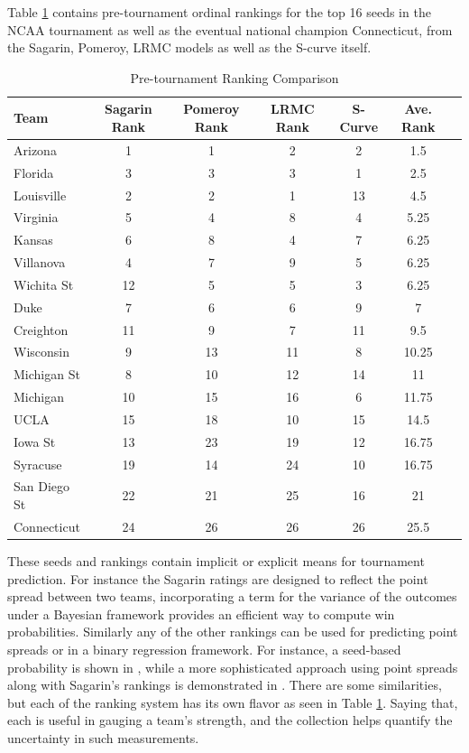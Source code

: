 \documentclass[letterpaper,12pt]{article}
\begin{document}
Table \ref{tab:ranks} contains pre-tournament ordinal rankings for the top 16 seeds in the NCAA tournament as well as the eventual national champion Connecticut, from the Sagarin, Pomeroy, LRMC models as well as the S-curve itself.
\begin{table}[h!]
\caption{Pre-tournament Ranking Comparison}
\footnotesize
\centering
\begin{tabular}{l|ccccc|c}
  \hline
  \hline
 Team & Sagarin Rank &  Pomeroy Rank  & LRMC Rank & S-Curve& Ave. Rank  \\ 
  \hline
 Arizona         & 1  &1      & 2 & 2& 1.5  \\
 Florida          & 3  &3      &3 & 1& 2.5\\
 Louisville      & 2  &2      & 1 &13 & 4.5\\
 Virginia         & 5  &4       &8 & 4 &5.25\\
  Kansas         & 6  &8      & 4& 7 &6.25\\
 Villanova      & 4  &7       & 9 & 5 &6.25\\
 Wichita St    & 12 &5          &5 & 3 &6.25\\
 Duke             & 7  &6         &6 &9&7\\
  Creighton &  11 &   9   &7 &11& 9.5\\ 
 Wisconsin  &   9   &13     &  11 & 8 &10.25\\
 Michigan St & 8  &10   & 12& 14&11\\
 Michigan & 10 & 15&  16& 6 &11.75\\
 UCLA & 15& 18& 10 &15 &14.5\\
 Iowa St &13 &23  &19 &12 &16.75 \\
 Syracuse &19 &14   &24 &10 &16.75 \\
 San Diego St&22 &21   &25 &16 &21 \\
  \hline
  Connecticut & 24& 26& 26& 26&25.5\\
  \hline
   \hline
\end{tabular}
\label{tab:ranks}
\end{table}
These seeds and rankings contain implicit or explicit means for tournament prediction. For instance the Sagarin ratings are designed to reflect the point spread between two teams, incorporating a term for the variance of the outcomes under a Bayesian framework provides an efficient way to compute win probabilities. Similarly any of the other rankings can be used for predicting point spreads or in a binary regression framework. For instance, a seed-based probability is shown in \cite{schwertman1996}, while a more sophisticated approach using point spreads along with Sagarin's rankings is demonstrated in \cite{carlin1996}. There are some similarities, but each of the ranking system has its own flavor as seen in Table \ref{tab:ranks}. Saying that, each is useful in gauging a team's strength, and the collection helps quantify the uncertainty in such measurements.
\end{document}
